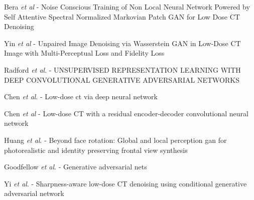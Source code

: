 \documentclass[journal]{IEEEtran}
\begin{document}
\cite{9474492} Bera \emph{et al} - Noise Conscious Training of Non Local Neural Network Powered by Self Attentive Spectral Normalized Markovian Patch GAN for Low Dose CT Denoising

\cite{yin2021unpaired} Yin \emph{et al} - Unpaired Image Denoising via Wasserstein GAN in Low-Dose CT Image with Multi-Perceptual Loss and Fidelity Loss

\cite{radford2015unsupervised} Radford \emph{et al}. - UNSUPERVISED REPRESENTATION LEARNING WITH DEEP CONVOLUTIONAL GENERATIVE ADVERSARIAL NETWORKS

\cite{chen2017low} Chen \emph{et al}. - Low-dose ct via deep neural network

\cite{chen2017low2} Chen \emph{et al} - Low-dose CT with a residual encoder-decoder convolutional neural network

\cite{huang2017beyond} Huang \emph{et al}. - Beyond face rotation: Global and local perception gan for photorealistic and identity preserving frontal view synthesis

\cite{goodfellow2014generative} Goodfellow \emph{et al}. - Generative adversarial nets

\cite{yi2018sharpness} Yi \emph{et al}. - Sharpness-aware low-dose CT denoising using conditional generative adversarial network





\end{document}
